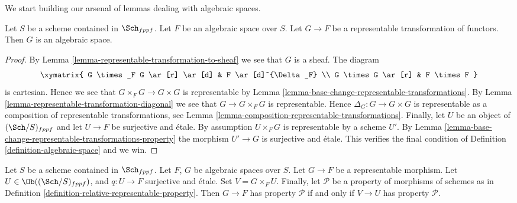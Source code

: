 \noindent
We start building our arsenal of lemmas dealing with algebraic spaces.

\begin{lemma}
\label{lemma-representable-over-space}
Let $S$ be a scheme contained in $\Sch_{fppf}$.
Let $F$ be an algebraic space over $S$.
Let $G \to F$ be a representable transformation of functors.
Then $G$ is an algebraic space.
\end{lemma}

\begin{proof}
By Lemma \ref{lemma-representable-transformation-to-sheaf}
we see that $G$ is a sheaf. The diagram
$$
\xymatrix{
G \times_F G \ar[r] \ar[d] & F \ar[d]^{\Delta_F} \\
G \times G \ar[r] & F \times F
}
$$
is cartesian. Hence we see that $G \times_F G \to G \times G$
is representable by
Lemma \ref{lemma-base-change-representable-transformations}.
By
Lemma \ref{lemma-representable-transformation-diagonal}
we see that $G \to G \times_F G$ is representable.
Hence $\Delta_G : G \to G \times G$ is representable as a composition
of representable transformations, see
Lemma \ref{lemma-composition-representable-transformations}.
Finally, let $U$ be an object of $(\Sch/S)_{fppf}$
and let $U \to F$ be surjective and \'etale. By assumption
$U \times_F G$ is representable by a scheme $U'$. By
Lemma \ref{lemma-base-change-representable-transformations-property}
the morphism $U' \to G$ is surjective and \'etale. This verifies
the final condition of Definition \ref{definition-algebraic-space} and we win.
\end{proof}

\begin{lemma}
\label{lemma-representable-morphisms-spaces-property}
Let $S$ be a scheme contained in $\Sch_{fppf}$.
Let $F$, $G$ be algebraic spaces over $S$.
Let $G \to F$ be a representable morphism.
Let $U \in \Ob((\Sch/S)_{fppf})$, and $q : U \to F$
surjective and \'etale. Set $V = G \times_F U$.
Finally, let $\mathcal{P}$ be a property of morphisms
of schemes as in Definition \ref{definition-relative-representable-property}.
Then $G \to F$ has property $\mathcal{P}$ if and only if
$V \to U$ has property $\mathcal{P}$.
\end{lemma}

